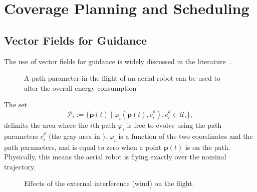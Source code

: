 
\chapter{\color{red}Coverage Planning and Scheduling}
\label{cp:dyn}




\section{\color{red}Vector Fields for Guidance}

The use of vector fields for guidance is widely discussed in the literature~\citep{lindemann2005smoothly,gonccalves2010vector,panagou2014motion,zhou2014vector,kapitanyuk2017guiding,de2017guidance}.

\begin{figure}[h]
  \centering
  
  \caption[Path parameter in the flight of an aerial robot]{A path parameter in the flight of an aerial robot can be used to alter the overall energy consumption}
  \label{fig:tee1}
\end{figure}
%  

The set
\begin{equation}\label{eq:area}
  \mathcal{P}_i:=\{\mathbf{p}(t)\mid\varphi_i(\mathbf{p}(t),c_{i}^\rho),c_i^\rho\in\mathcal{U}_i\},
\end{equation}
delimits the area where the $i$th path $\varphi_i$ is free to evolve using the path parameters $c_i^\rho$ (the gray area in ). $\varphi_i$ is a function of the two coordinates and the path parameters, and is equal to zero when a point $\mathbf{p}(t)$ is on the path. Physically, this means the aerial robot is flying exactly over the nominal trajectory. 

\begin{figure}[h]
  \centering
  
  \caption[External interference on the path]{Effects of the external interference (wind) on the flight.}
  \label{fig:tee3}
\end{figure}

